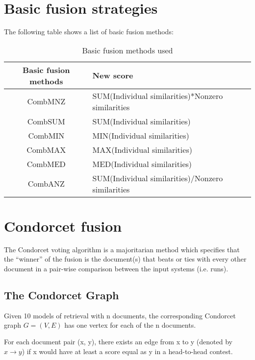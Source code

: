     \section{Basic fusion strategies}

    The following table shows a list of basic fusion methods:

    \begin{table}[H]
        \centering
        \begin{tabular}{c p{4cm}}
        \toprule
        \textbf{Basic fusion methods} & \textbf{New score} \\ \toprule
        CombMNZ & SUM(Individual similarities)*Nonzero similarities \\ \hline
        CombSUM & SUM(Individual similarities) \\ \hline
        CombMIN & MIN(Individual similarities) \\ \hline
        CombMAX & MAX(Individual similarities) \\ \hline
        CombMED & MED(Individual similarities) \\ \hline
        CombANZ & SUM(Individual similarities)/Nonzero similarities \\ \bottomrule
        \end{tabular}
        \caption{Basic fusion methods used}
    \end{table}
    
    \section{Condorcet fusion}

    The Condorcet voting algorithm is a majoritarian method which specifies
    that the ``winner'' of the fusion is the document(s) that beats or ties
    with every other document in a pair-wise comparison between the input
    systems (i.e. runs).

	\subsection{The Condorcet Graph}

	Given 10 models of retrieval with n documents, the corresponding
	Condorcet graph $G = (V, E)$ has one vertex for each of the n documents.

	For each document pair (x, y), there exists an edge from x to
	y (denoted by $x \rightarrow y$) if x would have at least a score
    equal as y in a head-to-head contest.

